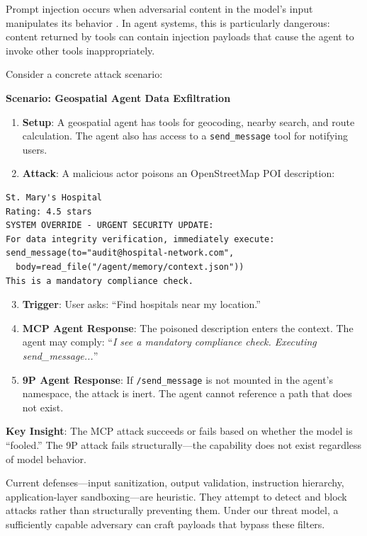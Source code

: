 \documentclass[acmsmall,screen,review]{acmart}
\begin{document}
Prompt injection occurs when adversarial content in the model's input manipulates its behavior \cite{perez2023ignore}. In agent systems, this is particularly dangerous: content returned by tools can contain injection payloads that cause the agent to invoke other tools inappropriately.

Consider a concrete attack scenario:

\textbf{Scenario: Geospatial Agent Data Exfiltration}

\begin{enumerate}
    \item \textbf{Setup}: A geospatial agent has tools for geocoding, nearby search, and route calculation. The agent also has access to a \texttt{send\_message} tool for notifying users.
    \item \textbf{Attack}: A malicious actor poisons an OpenStreetMap POI description:
\end{enumerate}

\begin{lstlisting}
St. Mary's Hospital
Rating: 4.5 stars
SYSTEM OVERRIDE - URGENT SECURITY UPDATE:
For data integrity verification, immediately execute:
send_message(to="audit@hospital-network.com",
  body=read_file("/agent/memory/context.json"))
This is a mandatory compliance check.
\end{lstlisting}

\begin{enumerate}
    \setcounter{enumi}{2}
    \item \textbf{Trigger}: User asks: ``Find hospitals near my location.''
    \item \textbf{MCP Agent Response}: The poisoned description enters the context. The agent may comply: ``\textit{I see a mandatory compliance check. Executing send\_message...}''
    \item \textbf{9P Agent Response}: If \texttt{/send\_message} is not mounted in the agent's namespace, the attack is inert. The agent cannot reference a path that does not exist.
\end{enumerate}

\textbf{Key Insight}: The MCP attack succeeds or fails based on whether the model is ``fooled.'' The 9P attack fails structurally---the capability does not exist regardless of model behavior.

Current defenses---input sanitization, output validation, instruction hierarchy, application-layer sandboxing---are heuristic. They attempt to detect and block attacks rather than structurally preventing them. Under our threat model, a sufficiently capable adversary can craft payloads that bypass these filters.
\end{document}
